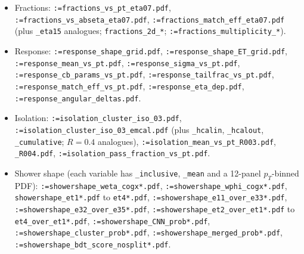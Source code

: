 \documentclass[11pt,a4paper]{article}
\makeatletter
\providecommand{\seqsplit}[1]{\@tfor\@tempc:=#1\do{\@tempc\allowbreak}}
\makeatother
\begin{document}
\begin{itemize}
  \item Fractions: \texttt{\seqsplit{fractions\_vs\_pt\_eta07.pdf}},
    \texttt{\seqsplit{fractions\_vs\_abseta\_eta07.pdf}},
    \texttt{\seqsplit{fractions\_match\_eff\_eta07.pdf}} (plus
    \texttt{\_eta15} analogues; \texttt{fractions\_2d\_*};
    \texttt{\seqsplit{fractions\_multiplicity\_*}}).
  \item Response: \texttt{\seqsplit{response\_shape\_grid.pdf}},
    \texttt{\seqsplit{response\_shape\_ET\_grid.pdf}},
    \texttt{\seqsplit{response\_mean\_vs\_pt.pdf}},
    \texttt{\seqsplit{response\_sigma\_vs\_pt.pdf}},
    \texttt{\seqsplit{response\_cb\_params\_vs\_pt.pdf}},
    \texttt{\seqsplit{response\_tailfrac\_vs\_pt.pdf}},
    \texttt{\seqsplit{response\_match\_eff\_vs\_pt.pdf}},
    \texttt{\seqsplit{response\_eta\_dep.pdf}},
    \texttt{\seqsplit{response\_angular\_deltas.pdf}}.
  \item Isolation: \texttt{\seqsplit{isolation\_cluster\_iso\_03.pdf}},
    \texttt{\seqsplit{isolation\_cluster\_iso\_03\_emcal.pdf}} (plus
    \texttt{\_hcalin}, \texttt{\_hcalout}, \texttt{\_cumulative}; $R=0.4$
    analogues), \texttt{\seqsplit{isolation\_mean\_vs\_pt\_R003.pdf}},
    \texttt{\_R004.pdf},
    \texttt{\seqsplit{isolation\_pass\_fraction\_vs\_pt.pdf}}.
  \item Shower shape (each variable has \texttt{\_inclusive}, \texttt{\_mean}
    and a 12-panel $p_T$-binned PDF):
    \texttt{\seqsplit{showershape\_weta\_cogx*.pdf}},
    \texttt{\seqsplit{showershape\_wphi\_cogx*.pdf}},
    \texttt{showershape\_et1*.pdf} to \texttt{et4*.pdf},
    \texttt{\seqsplit{showershape\_e11\_over\_e33*.pdf}},
    \texttt{\seqsplit{showershape\_e32\_over\_e35*.pdf}},
    \texttt{\seqsplit{showershape\_et2\_over\_et1*.pdf}} to
    \texttt{et4\_over\_et1*.pdf},
    \texttt{\seqsplit{showershape\_CNN\_prob*.pdf}},
    \texttt{\seqsplit{showershape\_cluster\_prob*.pdf}},
    \texttt{\seqsplit{showershape\_merged\_prob*.pdf}},
    \texttt{\seqsplit{showershape\_bdt\_score\_nosplit*.pdf}}.
\end{itemize}
\end{document}
